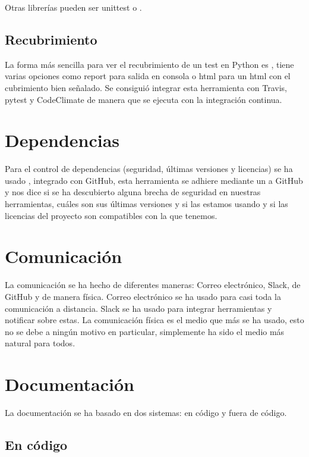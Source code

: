 Otras librerías pueden ser unittest o .


\subsection{Recubrimiento}

La forma más sencilla para ver el recubrimiento de un test en Python es , tiene varias opciones como report para salida en consola o html para un html con el cubrimiento bien señalado. Se consiguió integrar esta herramienta con Travis, pytest y CodeClimate de manera que se ejecuta con la integración continua.


\section{Dependencias}

Para el control de dependencias (seguridad, últimas versiones y licencias) se ha usado , integrado con GitHub, esta herramienta se adhiere mediante un  a GitHub y nos dice si se ha descubierto alguna brecha de seguridad en nuestras herramientas, cuáles son sus últimas versiones y si las estamos usando y si las licencias del proyecto son compatibles con la que tenemos.


\section{Comunicación}

La comunicación se ha hecho de diferentes maneras: Correo electrónico, Slack,  de GitHub y de manera física. Correo electrónico se ha usado para casi toda la comunicación a distancia. Slack se ha usado para integrar herramientas y notificar sobre estas. La comunicación física es el medio que más se ha usado, esto no se debe a ningún motivo en particular, simplemente ha sido el medio más natural para todos.


\section{Documentación}

La documentación se ha basado en dos sistemas: en código y fuera de código. 

\subsection{En código}

